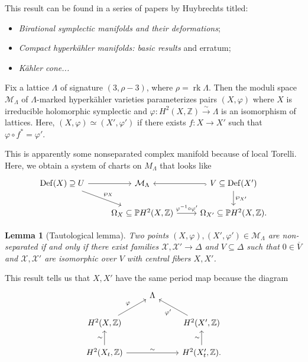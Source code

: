 \documentclass[leqno, openany]{memoir}
\newtheorem{lem}[thm]{Lemma}
\theoremstyle{definition}
\theoremstyle{remark}
\theoremstyle{plain}
\theoremstyle{definition}
\theoremstyle{remark}
\newcommand{\Z}{\mathbb{Z}}
\renewcommand{\P}{\mathbb{P}}
\newcommand{\mc}[1]{\mathcal{#1}}
\newcommand{\mr}[1]{\mathrm{#1}}
\newcommand{\ol}[1]{\overline{#1}}
\begin{document}
This result can be found in a series of papers by Huybrechts titled:
\begin{itemize}
    \item \textit{Birational symplectic manifolds and their deformations};
    \item \textit{Compact hyperk\"ahler manifolds: basic results} and erratum;
    \item \textit{K\"ahler cone...} 
\end{itemize}

Fix a lattice $\Lambda$ of signature $(3, \rho-3)$, where $\rho = \operatorname{rk} \Lambda$. Then the moduli space $\mc{M}_{\Lambda}$ of $\Lambda$-marked hyperk\"ahler varieties parameterizes pairs $(X, \varphi)$ where $X$ is irreducible holomorphic symplectic and $\varphi \colon H^2(X, \Z) \xrightarrow{\sim} \Lambda$ is an isomorphism of lattices. Here, $(X, \varphi) \simeq (X', \varphi')$ if there exists $f \colon X \to X'$ such that $\varphi \circ f^* = \varphi'$.

This is apparently some nonseparated complex manifold because of local Torelli. Here, we obtain a system of charts on $M_{\Lambda}$ that looks like
\begin{equation*}
\begin{tikzcd}
    \mr{Def}(X) \supseteq U \ar{r} \ar{dr}{\wp_X} & \mc{M}_{\Lambda} & V \subseteq \mr{Def}(X') \ar{d}{\wp_{X'}} \ar[hookrightarrow]{l} \\
    & \Omega_X \subseteq \P H^2(X, \Z) \ar{r}{\varphi^{-1} \circ \varphi'} & \Omega_{X'} \subseteq \P H^2(X, \Z).
\end{tikzcd}
\end{equation*}

\begin{lem}[Tautological lemma]
    Two points $(X, \varphi), (X', \varphi') \in \mc{M}_{\Lambda}$ are non-separated if and only if there exist families $\mc{X}, \mc{X}' \to \Delta$ and $V \subseteq \Delta$ such that $0 \in \ol{V}$ and $\mc{X}, \mc{X}'$ are isomorphic over $V$ with central fibers $X, X'$.
\end{lem}

This result tells us that $X, X'$ have the same period map because the diagram
\begin{equation*}
\begin{tikzcd}
    & \Lambda \\
    H^2(X, \Z) \ar{ur}{\varphi} & & H^2(X', \Z) \ar{ul}{\varphi'} \\
    H^2(X_t, \Z) \ar{u}{\sim} \ar{rr}{\sim} & & H^2(X_t', \Z) \ar{u}{\sim}.
\end{tikzcd}
\end{equation*}
\end{document}
